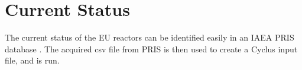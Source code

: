 \section{Current Status}
The current status of the EU reactors can be identified easily
in an \gls{IAEA} \gls{PRIS} database \cite{IAEA_PRIS_2017}.
The acquired csv file from \gls{PRIS} is then used to create a
Cyclus input file, and is run.
